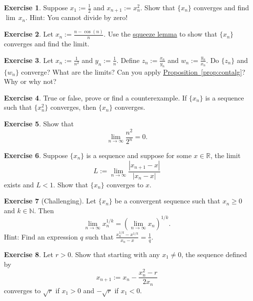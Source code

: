 \documentclass[12pt]{book}
\newcommand{\abs}[1]{\left\lvert {#1} \right\rvert}
\newcommand{\R}{{\mathbb{R}}}
\newcommand{\N}{{\mathbb{N}}}
\theoremstyle{plain}
\theoremstyle{remark}
\theoremstyle{definition}
\theoremstyle{exercise}
\newtheorem{exercise}{Exercise}[section]
\theoremstyle{example}
\newcommand{\propref}[1]{\hyperref[#1]{Proposition~\ref*{#1}}}
\begin{document}
\begin{exercise}
Suppose $x_1 := \frac{1}{2}$ and $x_{n+1} := x_n^2$.  Show that
$\{ x_n \}$ converges and find
$\lim\, x_n$.  Hint: You cannot divide by zero!
\end{exercise}

\begin{exercise}
Let $x_n := \frac{n-\cos(n)}{n}$.  Use the
\hyperref[squeeze:lemma]{squeeze lemma} to show that
$\{ x_n \}$ converges and find the limit.
\end{exercise}

\begin{exercise}
Let $x_n := \frac{1}{n^2}$ and $y_n := \frac{1}{n}$.  Define
$z_n := \frac{x_n}{y_n}$ and 
$w_n := \frac{y_n}{x_n}$.  Do $\{ z_n \}$ and $\{ w_n \}$
converge?  What are the limits?  Can you apply \propref{prop:contalg}?
Why or why not?
\end{exercise}

\begin{exercise}
True or false, prove or find a counterexample.  If $\{ x_n \}$ is a sequence
such that $\{ x_n^2 \}$ converges, then $\{ x_n \}$ converges.
\end{exercise}

\begin{exercise}
Show that
\begin{equation*}
\lim_{n\to\infty} \frac{n^2}{2^n} = 0 .
\end{equation*}
\end{exercise}

\begin{exercise}
Suppose $\{ x_n \}$ is a sequence and suppose for
some $x \in \R$, the limit
\begin{equation*}
L := \lim_{n \to \infty} \frac{\abs{x_{n+1}-x}}{\abs{x_n-x}}
\end{equation*}
exists and $L < 1$.  Show that $\{ x_n \}$ converges to $x$.
\end{exercise}

\begin{exercise}[Challenging]
Let $\{ x_n \}$ be a convergent sequence such
that $x_n \geq 0$ and $k \in \N$.
Then
\begin{equation*}
\lim_{n\to\infty} x_n^{1/k} =
{\left( \lim_{n\to\infty} x_n \right)}^{1/k} .
\end{equation*}
Hint: Find an expression $q$ such that $\frac{x_n^{1/k}-x^{1/k}}{x_n-x} =
\frac{1}{q}$.
\end{exercise}

\begin{exercise}
Let $r > 0$.  Show that starting with any $x_1 \not= 0$, the sequence
defined by
\begin{equation*}
x_{n+1} := x_n - \frac{x_n^2-r}{2x_n}
\end{equation*}
converges to $\sqrt{r}$ if $x_1 > 0$ and $-\sqrt{r}$ if $x_1 < 0$.
\end{exercise}
\end{document}
